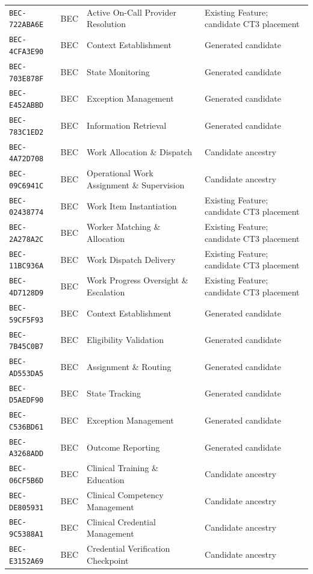 \documentclass[11pt,a4paper,openany]{book}
\begin{document}
\begin{longtable}{@{}p{.19\linewidth}p{.12\linewidth}p{.39\linewidth}p{.24\linewidth}@{}}
\texttt{BEC-722ABA6E} & BEC & Active On-Call Provider Resolution & Existing Feature; candidate CT3 placement \\
\texttt{BEC-4CFA3E90} & BEC & Context Establishment & Generated candidate \\
\texttt{BEC-703E878F} & BEC & State Monitoring & Generated candidate \\
\texttt{BEC-E452ABBD} & BEC & Exception Management & Generated candidate \\
\texttt{BEC-783C1ED2} & BEC & Information Retrieval & Generated candidate \\
\texttt{BEC-4A72D708} & BEC & Work Allocation \& Dispatch & Candidate ancestry \\
\texttt{BEC-09C6941C} & BEC & Operational Work Assignment \& Supervision & Candidate ancestry \\
\texttt{BEC-02438774} & BEC & Work Item Instantiation & Existing Feature; candidate CT3 placement \\
\texttt{BEC-2A278A2C} & BEC & Worker Matching \& Allocation & Existing Feature; candidate CT3 placement \\
\texttt{BEC-11BC936A} & BEC & Work Dispatch Delivery & Existing Feature; candidate CT3 placement \\
\texttt{BEC-4D7128D9} & BEC & Work Progress Oversight \& Escalation & Existing Feature; candidate CT3 placement \\
\texttt{BEC-59CF5F93} & BEC & Context Establishment & Generated candidate \\
\texttt{BEC-7B45C0B7} & BEC & Eligibility Validation & Generated candidate \\
\texttt{BEC-AD553DA5} & BEC & Assignment \& Routing & Generated candidate \\
\texttt{BEC-D5AEDF90} & BEC & State Tracking & Generated candidate \\
\texttt{BEC-C536BD61} & BEC & Exception Management & Generated candidate \\
\texttt{BEC-A3268ADD} & BEC & Outcome Reporting & Generated candidate \\
\texttt{BEC-06CF5B6D} & BEC & Clinical Training \& Education & Candidate ancestry \\
\texttt{BEC-DE805931} & BEC & Clinical Competency Management & Candidate ancestry \\
\texttt{BEC-9C5388A1} & BEC & Clinical Credential Management & Candidate ancestry \\
\texttt{BEC-E3152A69} & BEC & Credential Verification Checkpoint & Candidate ancestry \\

\end{longtable}
\end{document}
